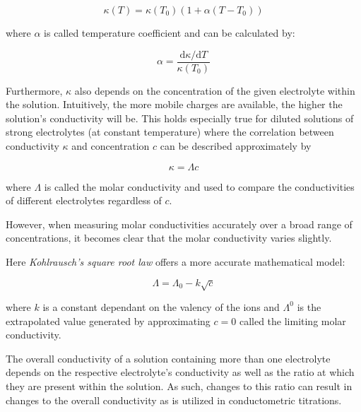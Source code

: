 \begin{equation} \label{eq:7.6}
    \kappa(T) = \kappa(T_0)(1 + \alpha(T - T_0))
\end{equation}

where $\alpha$ is called temperature coefficient and can be calculated by: 

\begin{equation} \label{eq:7.7}
    \alpha = \frac{\mathrm{d}\kappa / \mathrm{d}T}{\kappa(T_0)}
\end{equation}

Furthermore, $\kappa$ also depends on the concentration of the given electrolyte within the solution. Intuitively, the more mobile charges are available, the higher the solution's conductivity will be. This holds especially true for diluted solutions of strong electrolytes (at constant temperature) where the correlation between conductivity $\kappa$ and concentration $c$ can be described approximately by 

\begin{equation} \label{eq:7.8}
    \kappa = \Lambda c
\end{equation}

where $\Lambda$ is called the molar conductivity and used to compare the conductivities of different electrolytes regardless of $c$.

However, when measuring molar conductivities accurately over a broad range of concentrations, it becomes clear that the molar conductivity varies slightly.


Here \textit{Kohlrausch's square root law} offers a more accurate mathematical model:

\begin{equation} \label{eq:kohlrausch}
    \Lambda = \Lambda_0 - k \sqrt{c}
\end{equation}

where $k$ is a constant dependant on the valency of the ions and $\Lambda^0$ is the extrapolated value generated by approximating $c=0$ called the limiting molar conductivity.

The overall conductivity of a solution containing more than one electrolyte depends on the respective electrolyte's conductivity as well as the ratio at which they are present within the solution. As such, changes to this ratio can result in changes to the overall conductivity as is utilized in conductometric titrations. 
















